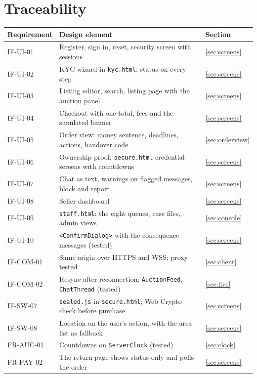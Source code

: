 \documentclass[11pt,a4paper]{article}
\begin{document}
\section{Traceability}
\label{app:trace}
{\small\begin{longtable}{@{}>{\ttfamily}p{2.4cm}>{\raggedright\arraybackslash}p{10.6cm}>{\raggedright\arraybackslash}p{2.2cm}@{}}
\toprule \textnormal{\textbf{Requirement}} & \textbf{Design element} & \textbf{Section} \\ \midrule \endhead
IF-UI-01 & Register, sign in, reset, security screen with sessions & \ref{sec:screens} \\
IF-UI-02 & KYC wizard in \texttt{kyc.html}; status on every step & \ref{sec:screens} \\
IF-UI-03 & Listing editor, search, listing page with the auction panel & \ref{sec:screens} \\
IF-UI-04 & Checkout with one total, fees and the simulated banner & \ref{sec:screens} \\
IF-UI-05 & Order view: money sentence, deadlines, actions, handover code & \ref{sec:orderview} \\
IF-UI-06 & Ownership proof; \texttt{secure.html} credential screens with countdowns & \ref{sec:screens} \\
IF-UI-07 & Chat as text, warnings on flagged messages, block and report & \ref{sec:screens} \\
IF-UI-08 & Seller dashboard & \ref{sec:screens} \\
IF-UI-09 & \texttt{staff.html}: the eight queues, case files, admin views & \ref{sec:console} \\
IF-UI-10 & \texttt{<ConfirmDialog>} with the consequence messages (tested) & \ref{sec:screens} \\
IF-COM-01 & Same origin over HTTPS and WSS; proxy tested & \ref{sec:client} \\
IF-COM-02 & Resync after reconnection; \texttt{AuctionFeed}, \texttt{ChatThread} (tested) & \ref{sec:live} \\
IF-SW-07 & \texttt{sealed.js} in \texttt{secure.html}; Web Crypto check before purchase & \ref{sec:screens} \\
IF-SW-08 & Location on the user's action, with the area list as fallback & \ref{sec:screens} \\
FR-AUC-01 & Countdowns on \texttt{ServerClock} (tested) & \ref{sec:clock} \\
FR-PAY-02 & The return page shows status only and polls the order & \ref{sec:screens} \\

\end{longtable}}
\end{document}
